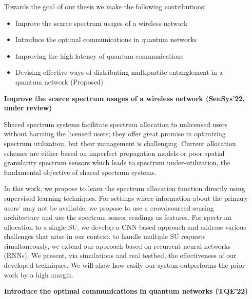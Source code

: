 Towards the goal of our thesis we make the following contributions:

\begin{itemize}
    \item Improve the scarce spectrum usages of a wireless network
    \item Introduce the optimal communications in quantum networks
    \item Improving the high latency of quantum communications
    \item Devising effective ways of distributing multipartite entanglement in a quantum network (Proposed)
\end{itemize}

\vspace{6pt}\noindent \textbf{Improve the scarce spectrum usages of a wireless network (SenSys'22, under review)}

Shared spectrum systems facilitate spectrum allocation to unlicensed users without harming the licensed users; they offer great promise in optimizing spectrum utilization, but their management is challenging.
Current allocation schemes are either based on imperfect propagation models or poor spatial granularity spectrum sensors which leads to spectrum under-utilization,  the fundamental objective of shared
spectrum systems.

In this work, we propose to learn the spectrum allocation function directly using supervised learning techniques. 
For settings where information about the primary users' may not be available, we propose to use a crowdsourced sensing architecture and use the spectrum sensor readings as features. 
For spectrum allocation to a single SU, we develop a CNN-based approach
and address various challenges that arise in our context; to handle multiple SU
requests simultaneously, we extend our approach based on recurrent neural networks (RNNs).
We present, via simulations and real testbed, the effectiveness of our developed techniques. We will show how easily our system outperforms the prior work by a high margin.


\vspace{6pt}\noindent \textbf{Introduce the optimal communications in quantum networks (TQE'22)}


